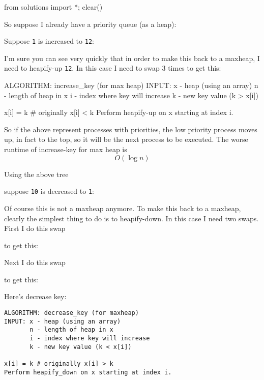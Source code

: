 \begin{python0}
from solutions import *; clear()
\end{python0}

So suppose I already have a priority queue (as a heap):




Suppose \texttt{1} is increased to \texttt{12}:




I'm sure you can see very quickly that in order to make this back to
a maxheap, I need to heapify-up \texttt{12}.
In this case I need to swap 3 times to get this:



\begin{console}
ALGORITHM: increase_key (for max heap)
INPUT: x - heap (using an array)
       n - length of heap in x
       i - index where key will increase
       k - new key value (k > x[i])

x[i] = k # originally x[i] < k
Perform heapify-up on x starting at index i.
\end{console}
So if the above represent processes with priorities, the low priority
process moves up, in fact to the top, so it will be the next process to
be executed.
The worse runtime of increase-key for max heap is
\[
O(\log n)
\]

Using the above tree



suppose \texttt{10} is decreased to \texttt{1}:



Of course this is not a maxheap anymore.
To make this back to a maxheap, clearly the simplest thing to do is
to heapify-down.
In this case I need two swaps.
First I do this swap



to get this:



Next I do this swap 



to get this:



Here's decrease key:

\begin{Verbatim}[frame=single]
ALGORITHM: decrease_key (for maxheap)
INPUT: x - heap (using an array)
       n - length of heap in x
       i - index where key will increase
       k - new key value (k < x[i])

x[i] = k # originally x[i] > k
Perform heapify_down on x starting at index i.
\end{Verbatim}

